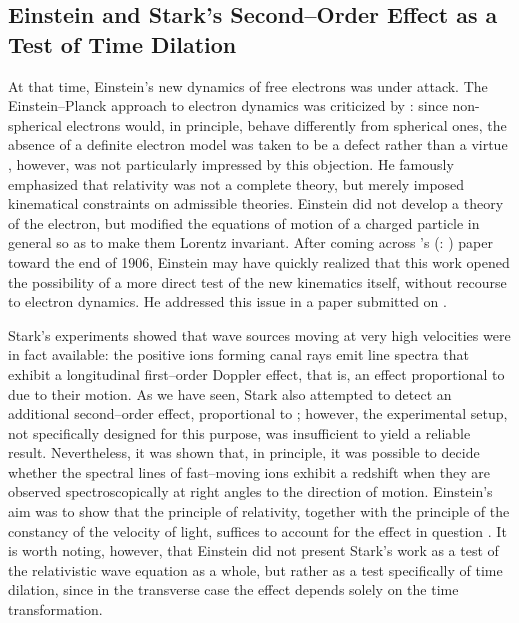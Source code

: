 \documentclass[pdflatex,sn-basic]{sn-jnl}
\renewcommand{\citets}[2][]{\citeauthor{#2}'s (\citeyear{#2}\if\relax\detokenize{#1}\relax\else: #1\fi)}
\begin{document}
\subsection{Einstein and Stark’s Second--Order Effect as a Test of Time Dilation}
%
At that time, Einstein’s new dynamics of free electrons was under attack. The Einstein--Planck approach to electron dynamics was criticized by \citet{Ehrenfest1907}: since no\citep[197]{Einstein1907d}n-spherical electrons would, in principle, behave differently from spherical ones, the absence of a definite electron model was taken to be a defect rather than a virtue \citet{Einstein1907a}, however, was not particularly impressed by this objection. He famously emphasized that relativity was not a complete theory, but merely imposed kinematical constraints on admissible theories. Einstein did not develop a theory of the electron, but modified the equations of motion of a charged particle in general so as to make them Lorentz invariant. After coming across \citets{Stark1906} paper toward the end of 1906, Einstein may have quickly realized that this work opened the possibility of a more direct test of the new kinematics itself, without recourse to electron dynamics. He addressed this issue in a paper submitted on . 

Stark’s experiments showed that wave sources moving at very high velocities were in fact available: the positive ions forming canal rays emit line spectra that exhibit a longitudinal first--order Doppler effect, that is, an effect proportional to \betafactorh due to their motion. As we have seen, Stark also attempted to detect an additional second--order effect, proportional to \betafactorsquaredh; however, the experimental setup, not specifically designed for this purpose, was insufficient to yield a reliable result. Nevertheless, it was shown that, in principle, it was possible to decide whether the spectral lines of fast--moving ions exhibit a redshift when they are observed spectroscopically at right angles to the direction of motion. Einstein’s aim was to show that the principle of relativity, together with the principle of the constancy of the velocity of light, suffices to account for the effect in question \citep[197]{Einstein1907d}. It is worth noting, however, that Einstein did not present Stark’s work as a test of the relativistic wave equation as a whole, but rather as a test specifically of time dilation, since in the transverse case the effect depends solely on the time transformation.

\end{document}
